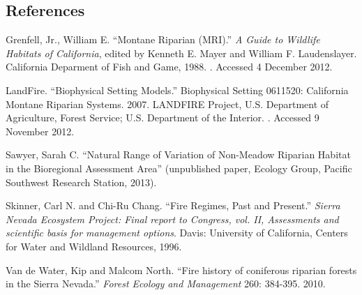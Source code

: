\subsection*{References}
\begin{hangparas}{.25in}{1} 
Grenfell, Jr., William E. ``Montane Riparian (MRI).'' \emph{A Guide to Wildlife Habitats of California}, edited by Kenneth E. Mayer and William F. Laudenslayer. California Deparment of Fish and Game, 1988. . Accessed 4 December 2012.

LandFire. ``Biophysical Setting Models.'' Biophysical Setting 0611520: California Montane Riparian Systems. 2007. LANDFIRE Project, U.S. Department of Agriculture, Forest Service; U.S. Department of the Interior. . Accessed 9 November 2012.

Sawyer, Sarah C. ``Natural Range of Variation of Non-Meadow Riparian Habitat in the Bioregional Assessment Area'' (unpublished paper, Ecology Group, Pacific Southwest Research Station, 2013).

Skinner, Carl N. and Chi-Ru Chang. ``Fire Regimes, Past and Present.'' \emph{Sierra Nevada Ecosystem Project: Final report to Congress, vol. II, Assessments and scientific basis for management options}. Davis: University of California, Centers for Water and Wildland Resources, 1996.

Van de Water, Kip and Malcom North. ``Fire history of coniferous riparian forests in the Sierra Nevada.'' \emph{Forest Ecology and Management} 260: 384-395. 2010.

\end{hangparas}




